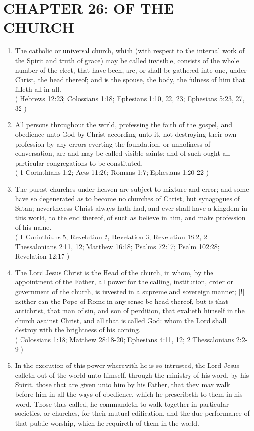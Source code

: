 \documentclass[12pt,a4paper]{book}
\begin{document}
\chapter{CHAPTER 26: OF THE CHURCH}
\label{ch-chu}
\begin{enumerate}
\item The catholic or universal church, which (with respect to the internal work of the Spirit and truth of grace) may be called invisible, consists of the whole number of the elect, that have been, are, or shall be gathered into one, under Christ, the head thereof; and is the spouse, the body, the fulness of him that filleth all in all.\\
( Hebrews 12:23; Colossians 1:18; Ephesians 1:10, 22, 23; Ephesians 5:23, 27, 32 )
\item All persons throughout the world, professing the faith of the gospel, and obedience unto God by Christ according unto it, not destroying their own profession by any errors everting the foundation, or unholiness of conversation, are and may be called visible saints; and of such ought all particular congregations to be constituted.\\
( 1 Corinthians 1:2; Acts 11:26; Romans 1:7; Ephesians 1:20-22 )
\item The purest churches under heaven are subject to mixture and error; and some have so degenerated as to become no churches of Christ, but synagogues of Satan; nevertheless Christ always hath had, and ever shall have a kingdom in this world, to the end thereof, of such as believe in him, and make profession of his name.\\
( 1 Corinthians 5; Revelation 2; Revelation 3; Revelation 18:2; 2 Thessalonians 2:11, 12; Matthew 16:18; Psalms 72:17; Psalm 102:28; Revelation 12:17 )
\item The Lord Jesus Christ is the Head of the church, in whom, by the appointment of the Father, all power for the calling, institution, order or government of the church, is invested in a supreme and sovereign manner; [!] neither can the Pope of Rome in any sense be head thereof, but is that antichrist, that man of sin, and son of perdition, that exalteth himself in the church against Christ, and all that is called God; whom the Lord shall destroy with the brightness of his coming.\\
( Colossians 1:18; Matthew 28:18-20; Ephesians 4:11, 12; 2 Thessalonians 2:2-9 )
\item In the execution of this power wherewith he is so intrusted, the Lord Jesus calleth out of the world unto himself, through the ministry of his word, by his Spirit, those that are given unto him by his Father, that they may walk before him in all the ways of obedience, which he prescribeth to them in his word. Those thus called, he commandeth to walk together in particular societies, or churches, for their mutual edification, and the due performance of that public worship, which he requireth of them in the world.\\

\end{enumerate}
\end{document}
